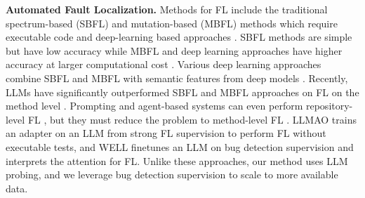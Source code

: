 \textbf{Automated Fault Localization.}
Methods for FL include the traditional spectrum-based (SBFL) and mutation-based (MBFL) methods which require executable code and deep-learning based approaches \citep{wong2016survey}. SBFL methods are simple but have low accuracy while MBFL and deep learning approaches have higher accuracy at larger computational cost \citep{wong2016survey}. Various deep learning approaches combine SBFL and MBFL with semantic features from deep models \citep{deepfl, transferfl, smartfl}. Recently, LLMs have significantly outperformed SBFL and MBFL approaches on FL on the method level \citep{wu2023large}. Prompting and agent-based systems can even perform repository-level FL \citep{agentless, agentfl}, but they must reduce the problem to method-level FL \citep{agentless}. LLMAO \citep{llmao} trains an adapter on an LLM from strong FL supervision to perform FL without executable tests, and WELL \citep{well} finetunes an LLM on bug detection supervision and interprets the attention for FL.
Unlike these approaches, our method uses LLM probing, and we leverage bug detection supervision to scale to more available data.


